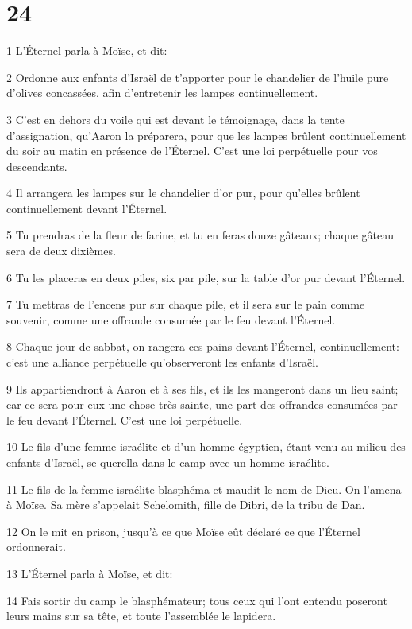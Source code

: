 \chapter{24}

\par 1 L'Éternel parla à Moïse, et dit:
\par 2 Ordonne aux enfants d'Israël de t'apporter pour le chandelier de l'huile pure d'olives concassées, afin d'entretenir les lampes continuellement.
\par 3 C'est en dehors du voile qui est devant le témoignage, dans la tente d'assignation, qu'Aaron la préparera, pour que les lampes brûlent continuellement du soir au matin en présence de l'Éternel. C'est une loi perpétuelle pour vos descendants.
\par 4 Il arrangera les lampes sur le chandelier d'or pur, pour qu'elles brûlent continuellement devant l'Éternel.
\par 5 Tu prendras de la fleur de farine, et tu en feras douze gâteaux; chaque gâteau sera de deux dixièmes.
\par 6 Tu les placeras en deux piles, six par pile, sur la table d'or pur devant l'Éternel.
\par 7 Tu mettras de l'encens pur sur chaque pile, et il sera sur le pain comme souvenir, comme une offrande consumée par le feu devant l'Éternel.
\par 8 Chaque jour de sabbat, on rangera ces pains devant l'Éternel, continuellement: c'est une alliance perpétuelle qu'observeront les enfants d'Israël.
\par 9 Ils appartiendront à Aaron et à ses fils, et ils les mangeront dans un lieu saint; car ce sera pour eux une chose très sainte, une part des offrandes consumées par le feu devant l'Éternel. C'est une loi perpétuelle.
\par 10 Le fils d'une femme israélite et d'un homme égyptien, étant venu au milieu des enfants d'Israël, se querella dans le camp avec un homme israélite.
\par 11 Le fils de la femme israélite blasphéma et maudit le nom de Dieu. On l'amena à Moïse. Sa mère s'appelait Schelomith, fille de Dibri, de la tribu de Dan.
\par 12 On le mit en prison, jusqu'à ce que Moïse eût déclaré ce que l'Éternel ordonnerait.
\par 13 L'Éternel parla à Moïse, et dit:
\par 14 Fais sortir du camp le blasphémateur; tous ceux qui l'ont entendu poseront leurs mains sur sa tête, et toute l'assemblée le lapidera.

